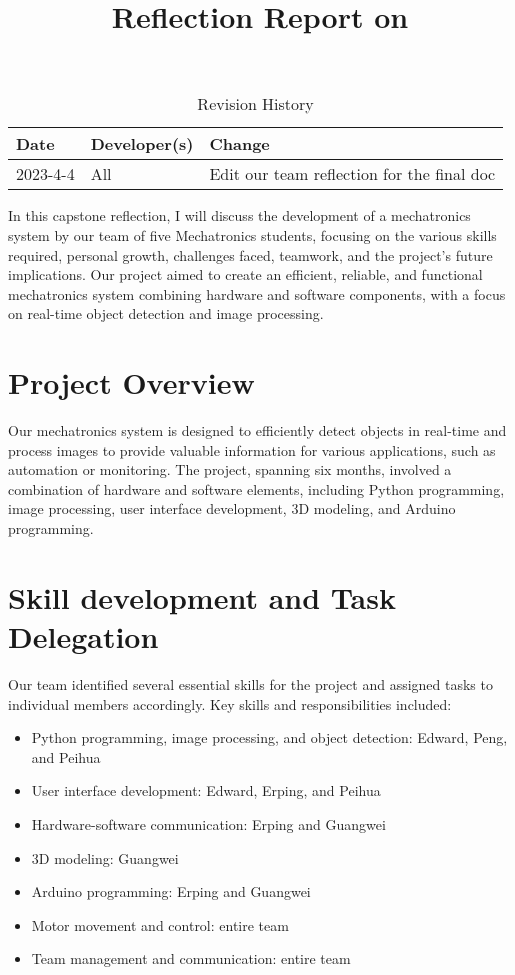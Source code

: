 \documentclass{article}
\title{Reflection Report on \progname}
\author{\authname}
\date{}
\begin{document}
\begin{table}[hp]
\caption{Revision History} \label{TblRevisionHistory}
\begin{tabularx}{\textwidth}{llX}
\toprule
\textbf{Date} & \textbf{Developer(s)} & \textbf{Change}\\
\midrule
2023-4-4 & All & Edit our team reflection for the final doc\\
\bottomrule
\end{tabularx}
\end{table}

\newpage

\maketitle

In this capstone reflection, I will discuss the development of a mechatronics system by our team of five Mechatronics students, focusing on the various skills required, personal growth, challenges faced, teamwork, and the project's future implications. Our project aimed to create an efficient, reliable, and functional mechatronics system combining hardware and software components, with a focus on real-time object detection and image processing.

\section{Project Overview}
Our mechatronics system is designed to efficiently detect objects in real-time and process images to provide valuable information for various applications, such as automation or monitoring. The project, spanning six months, involved a combination of hardware and software elements, including Python programming, image processing, user interface development, 3D modeling, and Arduino programming.
\section{Skill development and Task Delegation}
Our team identified several essential skills for the project and assigned tasks to individual members accordingly. Key skills and responsibilities included:
\begin{itemize}
    \item Python programming, image processing, and object detection: Edward, Peng, and Peihua
    \item User interface development: Edward, Erping, and Peihua
    \item Hardware-software communication: Erping and Guangwei
    \item 3D modeling: Guangwei
    \item Arduino programming: Erping and Guangwei
    \item Motor movement and control: entire team
    \item Team management and communication: entire team
\end{itemize}
\end{document}
